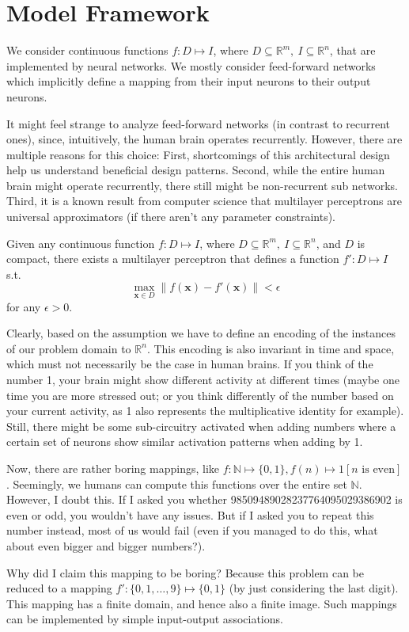 \documentclass[../../main.tex]{subfiles}
\begin{document}
    \section{Model Framework}
    We consider continuous functions $f: D \mapsto I$, where $D \subseteq \mathbb{R}^m , \ I \subseteq \mathbb{R}^n$, that are implemented by neural networks. We mostly consider feed-forward networks which implicitly define a mapping from their input neurons to their output neurons.

    It might feel strange to analyze feed-forward networks (in contrast to recurrent ones), since, intuitively, the human brain operates recurrently. However, there are multiple reasons for this choice: First, shortcomings of this architectural design help us understand beneficial design patterns. Second, while the entire human brain might operate recurrently, there still might be non-recurrent sub networks. Third, it is a known result from computer science that multilayer perceptrons are universal approximators (if there aren't any parameter constraints).

    \begin{theorem}
        Given any continuous function $f: D \mapsto I$, where $D \subseteq \mathbb{R}^m , \ I \subseteq \mathbb{R}^n$, and $D$ is compact, there exists a multilayer perceptron that defines a function $f': D \mapsto I$ s.t. 
        \[
            \underset{\bm{x} \in D}{\max} \|f(\bm{x}) - f'(\bm{x})\| < \epsilon
        \]
        for any $\epsilon > 0$.
    \end{theorem}

    Clearly, based on the assumption we have to define an encoding of the instances of our problem domain to $\mathbb{R}^n$. This encoding is also invariant in time and space, which must not necessarily be the case in human brains. If you think of the number 1, your brain might show different activity at different times (maybe one time you are more stressed out; or you think differently of the number based on your current activity, as 1 also represents the multiplicative identity for example). Still, there might be some sub-circuitry activated when adding numbers where a certain set of neurons show similar activation patterns when adding by 1.

    Now, there are rather boring mappings, like $f: \mathbb{N} \mapsto \{0, 1\}, f(n) \mapsto 1[n \text{ is even}]$. Seemingly, we humans can compute this functions over the entire set $\mathbb{N}$. However, I doubt this. If I asked you whether 98509489028237764095029386902 is even or odd, you wouldn't have any issues. But if I asked you to repeat this number instead, most of us would fail (even if you managed to do this, what about even bigger and bigger numbers?).

    Why did I claim this mapping to be boring? Because this problem can be reduced to a mapping $f': \{0, 1, \dots, 9\} \mapsto \{0, 1\}$ (by just considering the last digit). This mapping has a finite domain, and hence also a finite image. Such mappings can be implemented by simple input-output associations.
\end{document}
